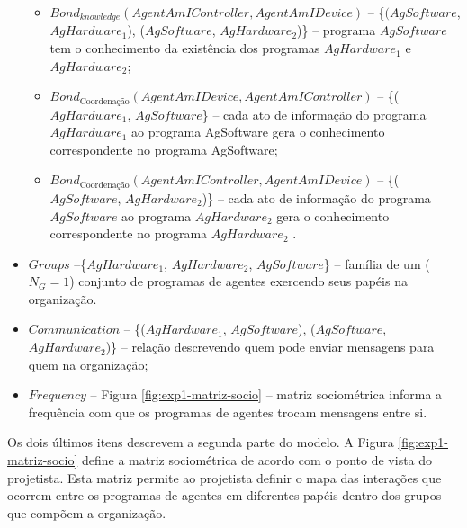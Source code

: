 \begin{itemize}
\begin{itemize}
        \item $Bond_{knowledge}(AgentAmIController, AgentAmIDevice)$ -- \{$(AgSoftware$, $AgHardware_1$), ($AgSoftware$, $AgHardware_2$)\} – programa $AgSoftware$ tem o conhecimento da existência dos programas $AgHardware_1$ e $AgHardware_2$;
        
        \item $Bond_{\textrm{Coordenação}}(AgentAmIDevice, AgentAmIController)$ -- \{($AgHardware_1$, $AgSoftware$\} – cada ato de informação do programa $AgHardware_1$ ao programa AgSoftware gera o conhecimento correspondente no programa AgSoftware;
        
        \item $Bond_{\textrm{Coordenação}}(AgentAmIController, AgentAmIDevice)$ -- \{($AgSoftware$, $AgHardware_2$)\} – cada ato de informação do programa $AgSoftware$ ao programa $AgHardware_2$ gera o conhecimento correspondente no programa $AgHardware_2$
        .
    \end{itemize}
    
    \item $Groups$ --\{$AgHardware_1$, $AgHardware_2$, $AgSoftware$\} – família de um ($N_G = 1$) conjunto de programas de agentes exercendo seus papéis na organização.
    
    \item $Communication$ -- \{($AgHardware_1$, $AgSoftware$), ($AgSoftware$, $AgHardware_2$)\} – relação descrevendo quem pode enviar mensagens para quem na organização;
    
    \item $Frequency$ -- Figura \ref{fig:exp1-matriz-socio} – matriz sociométrica informa a frequência com que os programas de agentes trocam mensagens entre si.
    
\end{itemize}
    
    Os dois últimos itens descrevem a segunda parte do modelo. A Figura \ref{fig:exp1-matriz-socio} define a matriz sociométrica de acordo com o ponto de vista do projetista. Esta matriz permite ao projetista definir o mapa das interações que ocorrem entre os programas de agentes em diferentes papéis dentro dos grupos que compõem a organização. 
    
    \begin{figure}[h!]
        \centering
    \end{figure}
    
